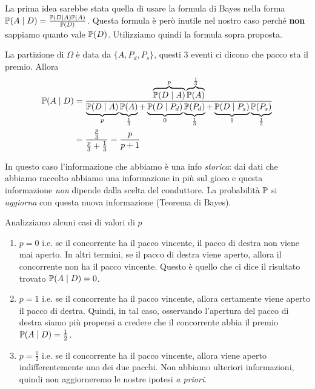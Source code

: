 \begin{enumerate}
	\begin{rem}
		La prima idea sarebbe stata quella di usare la formula di Bayes nella forma $\mathbb{P}(A\mid D) =\frac{\mathbb{P}(D\mid A)\mathbb{P}(A)}{\mathbb{P}(D)}$. Questa formula è però inutile nel nostro caso perché \textbf{non} sappiamo quanto vale $\mathbb{P}(D)$. Utilizziamo quindi la formula sopra proposta.
	\end{rem}

	La partizione di $\Omega $ è data da $\{A,P_{d} ,P_{s}\}$, questi $3$ eventi ci dicono che pacco sta il premio. Allora
	\begin{align*}
		\mathbb{P}(A\mid D) & =\frac{\overbrace{\mathbb{P}(D\mid A)}^{p}\overbrace{\mathbb{P}(A)}^{\frac{1}{3}}}{\underbrace{\mathbb{P}(D\mid A)}_{p}\underbrace{\mathbb{P}(A)}_{\frac{1}{3}} +\underbrace{\mathbb{P}(D\mid P_{d})}_{0}\underbrace{\mathbb{P}(P_{d})}_{\frac{1}{3}} +\underbrace{\mathbb{P}(D\mid P_{s})}_{1}\underbrace{\mathbb{P}(P_{s})}_{\frac{1}{3}}}\\
		 & =\frac{\frac{p}{3}}{\frac{p}{3} +\frac{1}{3}} =\frac{p}{p+1}
	\end{align*}

	\begin{rem}
		In questo caso l'informazione che abbiamo è una info \textit{storica}: dai dati che abbiamo raccolto abbiamo una informazione in più sul gioco e questa informazione \textit{non} dipende dalla scelta del conduttore. La probabilità $\mathbb{P}$ si \textit{aggiorna} con questa nuova informazione (Teorema di Bayes).
	\end{rem}

	Analizziamo alcuni casi di valori di $p$
	\begin{enumerate}
		\item $\boxed{p=0}$ i.e. se il concorrente ha il pacco vincente, il pacco di destra non viene mai aperto. In altri termini, se il pacco di destra viene aperto, allora il concorrente non ha il pacco vincente. Questo è quello che ci dice il risultato trovato $\mathbb{P}(A\mid D) =0$.
		\item $\boxed{p=1}$ i.e. se il concorrente ha il pacco vincente, allora certamente viene aperto il pacco di destra. Quindi, in tal caso, osservando l'apertura del pacco di destra siamo più propensi a credere che il concorrente abbia il premio $\mathbb{P}(A\mid D) =\frac{1}{2}$.
		\item $\boxed{p=\frac{1}{2}}$ i.e. se il concorrente ha il pacco vincente, allora viene aperto indifferentemente uno dei due pacchi. Non abbiamo ulteriori informazioni, quindi non aggiorneremo le nostre ipotesi \textit{a priori}.
	\end{enumerate}
\end{enumerate}

